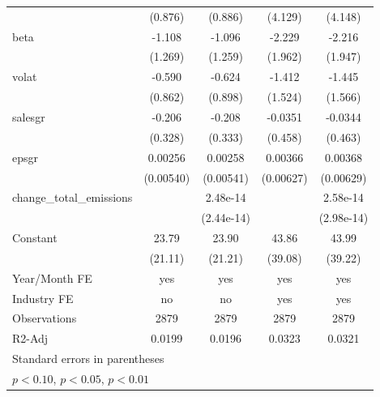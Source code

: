 \begin{table}[htbp]
\begin{tabular}{l*{4}{c}}
                    &     (0.876)         &     (0.886)         &     (4.129)         &     (4.148)         \\
[1em]
beta                &      -1.108         &      -1.096         &      -2.229         &      -2.216         \\
                    &     (1.269)         &     (1.259)         &     (1.962)         &     (1.947)         \\
[1em]
volat               &      -0.590         &      -0.624         &      -1.412         &      -1.445         \\
                    &     (0.862)         &     (0.898)         &     (1.524)         &     (1.566)         \\
[1em]
salesgr             &      -0.206         &      -0.208         &     -0.0351         &     -0.0344         \\
                    &     (0.328)         &     (0.333)         &     (0.458)         &     (0.463)         \\
[1em]
epsgr               &     0.00256         &     0.00258         &     0.00366         &     0.00368         \\
                    &   (0.00540)         &   (0.00541)         &   (0.00627)         &   (0.00629)         \\
[1em]
change\_total\_emissions&                     &    2.48e-14         &                     &    2.58e-14         \\
                    &                     &  (2.44e-14)         &                     &  (2.98e-14)         \\
[1em]
Constant            &       23.79         &       23.90         &       43.86         &       43.99         \\
                    &     (21.11)         &     (21.21)         &     (39.08)         &     (39.22)         \\
\hline
Year/Month FE       &         yes         &         yes         &         yes         &         yes         \\
Industry FE         &          no         &          no         &         yes         &         yes         \\
Observations        &        2879         &        2879         &        2879         &        2879         \\
R2-Adj              &      0.0199         &      0.0196         &      0.0323         &      0.0321         \\
\hline\hline
\multicolumn{5}{l}{\footnotesize Standard errors in parentheses}\\
\multicolumn{5}{l}{\footnotesize \sym{*} \(p<0.10\), \sym{**} \(p<0.05\), \sym{***} \(p<0.01\)}\\
\end{tabular}
\end{table}
